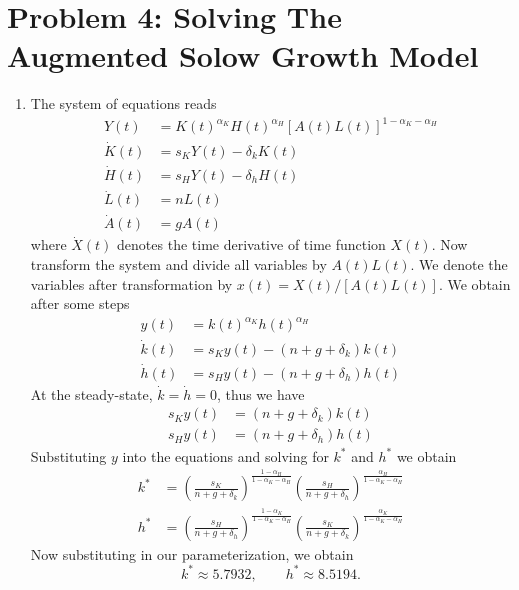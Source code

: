 \section*{Problem 4: Solving The Augmented Solow Growth Model}
\begin{enumerate}
\item
The system of equations reads
\begin{align}
	Y(t)&=K(t)^{\alpha_K}H(t)^{\alpha_H}[A(t)L(t)]^{1-\alpha_K-\alpha_H}\\
	\dot K(t)&=s_KY(t)-\delta_kK(t)\\
	\dot H(t)&=s_HY(t)-\delta_hH(t)\\
	\dot L(t)&=nL(t)\\
	\dot A(t)&=gA(t)
\end{align}
where $\dot X(t)$ denotes the time derivative of time function $X(t)$. Now transform the system and divide all variables by $A(t)L(t)$. We denote the variables after transformation by $ x(t)=X(t)/[A(t)L(t)]$. We obtain after some steps
\begin{align}
\label{eq_y}
	 y(t)&= k(t)^{\alpha_K}h(t)^{\alpha_H}\\
\label{eq_k}
	\dot{ k}(t)&=s_K y(t)-(n+g+\delta_k) k(t)\\
\label{eq_h}
	\dot{ h}(t)&=s_H y(t)-(n+g+\delta_h) h(t)
\end{align}
At the steady-state, $\dot{ k}=\dot{ h}=0$, thus we have
\begin{align}
	s_K y(t)&=(n+g+\delta_k) k(t)\\
	s_H y(t)&=(n+g+\delta_h) h(t)
\end{align}
Substituting $ y$ into the equations and solving for $ k^*$ and $ h^*$ we obtain
\begin{align}
	 k^*&=\left(\frac{s_K}{n+g+\delta_k}\right)^{\frac{1-\alpha_H}{1-\alpha_K-\alpha_H}}
				\left(\frac{s_H}{n+g+\delta_h}\right)^{\frac{\alpha_H}{1-\alpha_K-\alpha_H}}\\
	 h^*&=\left(\frac{s_H}{n+g+\delta_h}\right)^{\frac{1-\alpha_K}{1-\alpha_K-\alpha_H}}
				\left(\frac{s_K}{n+g+\delta_k}\right)^{\frac{\alpha_K}{1-\alpha_K-\alpha_H}}
\end{align}
Now substituting in our parameterization, we obtain
\begin{equation}
	k^*\approx5.7932,\qquad
	h^*\approx8.5194.
\end{equation}


\end{enumerate}
